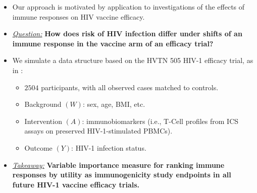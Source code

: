 \documentclass[landscape,a0paper,fontscale=0.285]{baposter} %
\newcommand{\compresslist}{ %
\setlength{\itemsep}{1pt}
\setlength{\parskip}{0pt}
\setlength{\parsep}{0pt}
}
\begin{document}
\begin{poster}
{\begin{itemize}\compresslist
\setlength\itemsep{0.5em}
\item Our approach is motivated by application to investigations of the effects
  of immune responses on HIV vaccine efficacy.
\item \underline{\textit{Question:}} \textbf{How does risk of HIV infection
   differ under shifts of an immune response in the vaccine arm of an efficacy
   trial?}
\item We simulate a data structure based on the HVTN 505 HIV-1 efficacy trial,
  as in \cite{janes2017higher}:
  \begin{itemize}
    \itemsep0.25pt
    \item $2504$ participants, with all observed cases matched to controls.
    \item Background $(W)$: sex, age, BMI, etc.
    \item Intervention $(A)$: immunobiomarkers (i.e., T-Cell profiles from ICS
      assays on preserved HIV-1-stimulated PBMCs).
    \item Outcome $(Y)$: HIV-1 infection status.
  \end{itemize}
\item \underline{\textit{Takeaway:}} \textbf{Variable importance measure for
   ranking immune responses by utility as immunogenicity study endpoints in all
   future HIV-1 vaccine efficacy trials.}
\end{itemize}
}


\end{poster}
\end{document}
